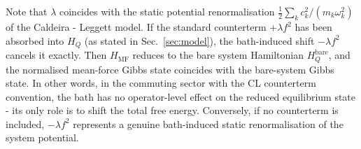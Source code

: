 Note that $\lambda$ coincides with the static potential renormalisation
$\frac{1}{2}\sum_k c_k^2/(m_k\omega_k^2)$ of the Caldeira - Leggett
model. If the standard counterterm $+\lambda f^2$ has been absorbed into
$H_Q$ (as stated in Sec.~\ref{sec:model}), the bath-induced shift
$-\lambda f^2$ cancels it exactly. Then $H_{\mathrm{MF}}$ reduces to the bare system Hamiltonian $H_Q^{\mathrm{bare}}$, and the normalised mean-force Gibbs state coincides with the bare-system
Gibbs state. In other words, in the commuting sector with the CL counterterm
convention, the bath has no operator-level effect on the reduced equilibrium
state - its only role is to shift the total free energy.
Conversely, if no counterterm is included, $-\lambda f^2$ represents a genuine
bath-induced static renormalisation of the system potential.
